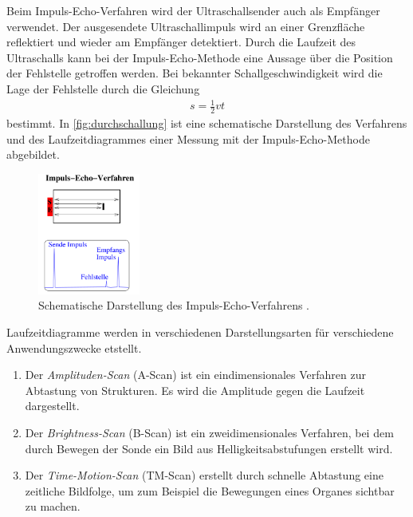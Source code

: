 Beim Impuls-Echo-Verfahren wird der Ultraschallsender auch als Empfänger verwendet. Der ausgesendete Ultraschallimpuls wird an einer Grenzfläche reflektiert und wieder am Empfänger detektiert. Durch die Laufzeit des
Ultraschalls kann bei der Impuls-Echo-Methode eine Aussage über die Position der Fehlstelle getroffen werden. Bei bekannter Schallgeschwindigkeit wird die Lage der Fehlstelle durch die Gleichung 
\begin{align}
    \label{eqn:lageFehler}
    s = \frac 12 v t
\end{align}
bestimmt. 
In \autoref{fig:durchschallung} ist eine schematische Darstellung des Verfahrens und des Laufzeitdiagrammes einer Messung mit der Impuls-Echo-Methode abgebildet.
\begin{figure}[H]
    \centering
    \includegraphics[width=0.3\textwidth]{data/ImpulsEchoVerfahren.png}
    \caption{Schematische Darstellung des Impuls-Echo-Verfahrens \cite{AnleitungUS2}.}
    \label{fig:impulsEcho}
\end{figure}
Laufzeitdiagramme werden in verschiedenen Darstellungsarten für verschiedene Anwendungszwecke etstellt.
\begin{enumerate}
    \item Der \textit{Amplituden-Scan} (A-Scan) ist ein eindimensionales Verfahren zur Abtastung von Strukturen. Es wird die Amplitude gegen die Laufzeit dargestellt.
    \item Der \textit{Brightness-Scan} (B-Scan) ist ein zweidimensionales Verfahren, bei dem durch Bewegen der Sonde ein Bild aus Helligkeitsabstufungen erstellt wird.
    \item Der \textit{Time-Motion-Scan} (TM-Scan) erstellt durch schnelle Abtastung eine zeitliche Bildfolge, um zum Beispiel die Bewegungen eines Organes sichtbar zu machen.
\end{enumerate}
